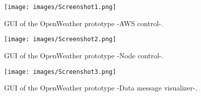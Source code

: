 \thispagestyle{empty}

\begin{figure}[H]
\centerline{\texttt{[image: images/Screenshot1.png]}}
\caption{\protect \gls{GUI} of the OpenWeather prototype -AWS control-.}
\end{figure}
 
\begin{figure}[H]
\centerline{\texttt{[image: images/Screenshot2.png]}}
\caption{\protect \gls{GUI} of the OpenWeather prototype -Node control-.}
\end{figure}

\begin{figure}[H]
\centerline{\texttt{[image: images/Screenshot3.png]}}
\caption{\protect \gls{GUI} of the OpenWeather prototype -Data message visualizer-.}
\end{figure}
\thispagestyle{empty}
\pagebreak
